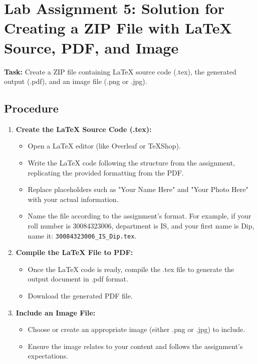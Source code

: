 \documentclass[a4paper,12pt]{article}
\begin{document}
\section{Lab Assignment 5: Solution for Creating a ZIP File with LaTeX Source, PDF, and Image}

\textbf{Task:} Create a ZIP file containing LaTeX source code (.tex), the generated output (.pdf), and an image file (.png or .jpg).

\subsection*{Procedure}
\begin{enumerate}[label=\arabic*.]
    \item \textbf{Create the LaTeX Source Code (.tex):}
    \begin{itemize}
        \item Open a LaTeX editor (like Overleaf or TeXShop).
        \item Write the LaTeX code following the structure from the assignment, replicating the provided formatting from the PDF.
        \item Replace placeholders such as "Your Name Here" and "Your Photo Here" with your actual information.
        \item Name the file according to the assignment’s format. For example, if your roll number is 30084323006, department is IS, and your first name is Dip, name it: \texttt{30084323006\_IS\_Dip.tex}.
    \end{itemize}

    \item \textbf{Compile the LaTeX File to PDF:}
    \begin{itemize}
        \item Once the LaTeX code is ready, compile the .tex file to generate the output document in .pdf format.
        \item Download the generated PDF file.
    \end{itemize}

    \item \textbf{Include an Image File:}
    \begin{itemize}
        \item Choose or create an appropriate image (either .png or .jpg) to include.
        \item Ensure the image relates to your content and follows the assignment’s expectations.
    \end{itemize}


\end{enumerate}
\end{document}
